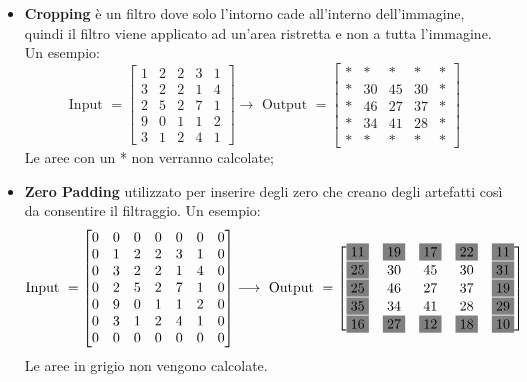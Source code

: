 \documentclass[a4paper]{article}
\begin{document}
	\begin{itemize}[label=-]
		\item \textbf{Cropping} è un filtro dove solo l'intorno cade all'interno dell'immagine, quindi il filtro viene applicato ad un'area ristretta e non a tutta l'immagine. Un esempio:
		\begin{equation*}
			\text{Input } = 
			\begin{bmatrix}
				1 & 2 & 2 & 3 & 1 \\
				3 & 2 & 2 & 1 & 4 \\
				2 & 5 & 2 & 7 & 1 \\
				9 & 0 & 1 & 1 & 2 \\
				3 & 1 & 2 & 4 & 1
			\end{bmatrix}
			\longrightarrow
			\text{ Output } = 
			\begin{bmatrix}
				* & * & * & * & * \\
				* & 30 & 45 & 30 & * \\
				* & 46 & 27 & 37 & * \\
				* & 34 & 41 & 28 & * \\
				* & * & * & * & *
			\end{bmatrix}
		\end{equation*}
		Le aree con un * non verranno calcolate;
		
		\item \textbf{Zero Padding} utilizzato per inserire degli zero che creano degli artefatti così da consentire il filtraggio. Un esempio:
		\begin{equation*}
			\text{Input } = 
			\begin{bmatrix}
				0 & 0 & 0 & 0 & 0 & 0 & 0 \\
				0 & 1 & 2 & 2 & 3 & 1 & 0 \\
				0 & 3 & 2 & 2 & 1 & 4 & 0 \\
				0 & 2 & 5 & 2 & 7 & 1 & 0 \\
				0 & 9 & 0 & 1 & 1 & 2 & 0 \\
				0 & 3 & 1 & 2 & 4 & 1 & 0 \\
				0 & 0 & 0 & 0 & 0 & 0 & 0
			\end{bmatrix}
			\longrightarrow
			\text{ Output } = 
			\begin{bmatrix}
				\colorbox{gray}{11} & \colorbox{gray}{19} & \colorbox{gray}{17} & \colorbox{gray}{22} & \colorbox{gray}{11} \\
				\colorbox{gray}{25} & 30 & 45 & 30 & \colorbox{gray}{31} \\
				\colorbox{gray}{25} & 46 & 27 & 37 & \colorbox{gray}{19} \\
				\colorbox{gray}{35} & 34 & 41 & 28 & \colorbox{gray}{29} \\
				\colorbox{gray}{16} & \colorbox{gray}{27} & \colorbox{gray}{12} & \colorbox{gray}{18} & \colorbox{gray}{10}
			\end{bmatrix}
		\end{equation*}
		Le aree in grigio non vengono calcolate.
		

\end{itemize}
\end{document}
